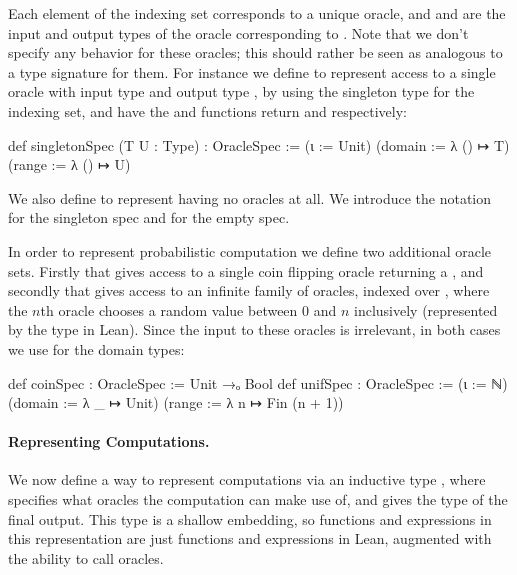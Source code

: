 Each element  of the indexing set corresponds to a unique oracle, and  and  are the input and output types of the oracle corresponding to .
Note that we don't specify any behavior for these oracles; this should rather be seen as analogous to a type signature for them.
For instance we define  to represent access to
a single oracle with input type  and output type ,
by using the singleton type  for the indexing set, and have the  and  functions return  and  respectively:
\begin{leancode}
  def singletonSpec (T U : Type) : OracleSpec :=
    (ι := Unit) (domain := λ () ↦ T) (range := λ () ↦ U)
\end{leancode}
We also define  to represent having no oracles at all.
We introduce the notation  for the singleton spec and  for the empty spec.

In order to represent probabilistic computation we define two additional oracle sets.
Firstly  that gives access to a single coin flipping oracle returning a ,
and secondly  that gives access to an infinite family of oracles, indexed over , where the $n$th oracle chooses a random value between $0$ and $n$ inclusively (represented by the type  in Lean).
Since the input to these oracles is irrelevant, in both cases we use  for the domain types:
\begin{leancode}
  def coinSpec : OracleSpec := Unit →ₒ Bool
  def unifSpec : OracleSpec :=
    (ι := ℕ) (domain := λ _ ↦ Unit) (range := λ n ↦ Fin (n + 1))
\end{leancode}

\paragraph{Representing Computations.}
We now define a way to represent computations via an inductive type , where  specifies what oracles the computation can make use of, and  gives the type of the final output.
This type is a shallow embedding, so functions and expressions in this representation are just functions and expressions in Lean, augmented with the ability to call oracles.

